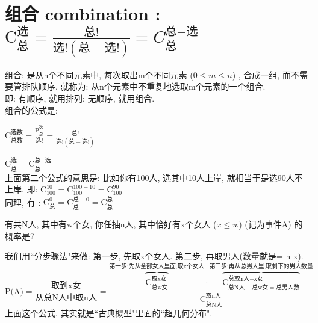 \documentclass[UTF8]{ctexart}
\begin{document}
	
	
	
	
	
	\section{组合 combination : $ \boxed{
		\text{C}_{\text{总}}^{\text{选}}=\frac{\text{总!}}{\text{选!}\left( \text{总}-\text{选!} \right)}	= C_{\text{总}}^{\text{总}-\text{选}}	}$}
	
	组合: 是从n个不同元素中, 每次取出m个不同元素 ($0 \leq m \leq n$) , 合成一组, 而不需要管排队顺序, 就称为: 从n个元素中不重复地选取m个元素的一个组合. \\
	
	即: 有顺序, 就用排列; 无顺序, 就用组合. \\
	
	组合的公式是: 
	
	$\boxed{
		\text{C}_{\text{总数}}^{\text{选数}}=\frac{\text{P}_{\text{总}}^{\text{选}}}{\text{选!}}=\frac{\text{总!}}{\text{选!}\left( \text{总}-\text{选!} \right)}	
	}$
	
	$\boxed{
		\text{C}_{\text{总}}^{\text{选}}=\text{C}_{\text{总}}^{\text{总}-\text{选}}	
	}$ \\
	
	上面第二个公式的意思是: 比如你有100人, 选其中10人上岸, 就相当于是选90人不上岸. 即: $\text{C}_{100}^{10}=\text{C}_{100}^{100-10}=\text{C}_{100}^{90}
	$ \\
	
	同理, 有 : $
	\boxed{\text{C}_{\text{总}}^{0}=\text{C}_{\text{总}}^{\text{总}-0}=\text{C}_{\text{总}}^{\text{总}}
	}$ \\
	
	
	\begin{myEnvSample}
		有共N人, 其中有w个女, 你任抽n人, 其中恰好有x个女人 ($x \leq w$) (记为事件A) 的概率是? 
		
		我们用``分步骤法"来做: 第一步, 先取x个女人. 第二步, 再取男人(数量就是= n-x). \\
		
		$
		\text{P(A)}=\dfrac{\text{取到x女}}{\text{从总N人中取n人}}=\dfrac{\overset{\text{第一步:先从全部女人里面,取x个女人}}{\overbrace{\text{C}_{\text{总w女}}^{\text{取x女}}}}\cdot \overset{\text{第二步:再从总男人里,取剩下的男人数量}}{\overbrace{\text{C}_{\text{总N人}-\text{总w女}=\text{总男人数}}^{\text{总取n人}-\text{x女}}}}}{\text{C}_{\text{总N人}}^{\text{取n人}}}
		$ \\
		
		上面这个公式, 其实就是``古典概型"里面的``超几何分布".
	\end{myEnvSample}
	\vspace{1em} 
	
\end{document}
